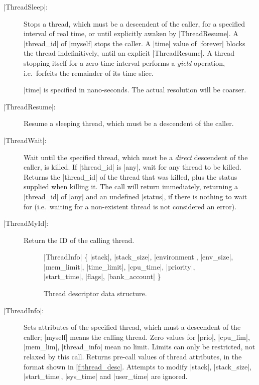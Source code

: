 \documentclass[a4paper,11pt,twoside,dvips]{report}
\begin{document}
\begin{description}
\item[|ThreadSleep|:] Stops a thread, which must be a
descendent of the caller, for a specified interval of real time,
or until explicitly awaken by |ThreadResume|. A |thread\_id| of |myself|
stops the caller. A |time| value of |forever| blocks the thread
indefinitively, until an explicit |ThreadResume|. A thread stopping
itself for a zero time interval performs a \emph{yield} operation, i.e.\
forfeits the remainder of its time slice.

|time| is specified in nano-seconds. The actual resolution will be
coarser.

\item[|ThreadResume|:] Resume a sleeping thread, which must be a
descendent of the caller.

\item[|ThreadWait|:] Wait until the specified thread, which
must be a \emph{direct} descendent of the caller, is killed. If
|thread\_id| is |any|, wait for any thread to be killed. Returns the
|thread\_id| of the thread that was killed, plus the status supplied
when killing it. The call will return immediately, returning a
|thread\_id| of |any| and an undefined |status|, if there is nothing to
wait for (i.e.\ waiting for a non-existent thread is not considered an
error).

\item[|ThreadMyId|:] Return the ID of the calling thread.

\begin{figure}[thb]
\begin{center}
\begin{programbox}
\TYPE |ThreadInfo| \BODY \{
	|stack|, |stack\_size|, |environment|, |env\_size|,
	|mem\_limit|, |time\_limit|, |cpu\_time|, |priority|, |start\_time|,
	|flags|,	|bank\_account|
\ENDTYPE\}
\end{programbox}
\caption{\label{f:thread_desc}Thread descriptor data structure.}
\end{center}
\end{figure}


\item[|ThreadInfo|:] Sets attributes of the specified thread, which must
a descendent of the caller; |myself| means the calling
thread. Zero values for |prio|, |cpu\_lim|, |mem\_lim|, |thread\_info|
mean no limit. Limits can only be restricted, not relaxed by this
call. Returns pre-call values of thread attributes, in the format shown in
\autoref{f:thread_desc}. Attempts to modify |stack|,
|stack\_size|, |start\_time|, |sys\_time| and |user\_time| are
ignored.


\end{description}
\end{document}
